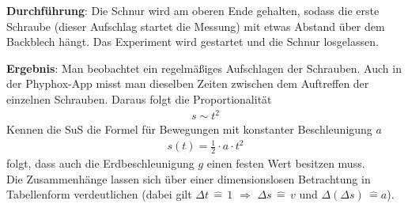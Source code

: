 \documentclass[../main.tex]{subfiles}
\begin{document}
\begin{tcolorbox}
    \vspace{-0.8cm}

    \begin{minipage}[]{0.7\textwidth}
        \textbf{Durchführung}:   Die Schnur wird am oberen Ende gehalten, sodass die erste Schraube (dieser Aufschlag startet die Messung) mit etwas Abstand über dem Backblech hängt. Das Experiment wird gestartet und die Schnur losgelassen.

        \vspace{0.5cm}
        \textbf{Ergebnis}: Man beobachtet ein regelmäßiges Aufschlagen der Schrauben. Auch in der Phyphox-App misst man dieselben Zeiten zwischen dem Auftreffen der einzelnen Schrauben. Daraus folgt die Proportionalität
        \begin{align*}
            s \sim t^2
        \end{align*}
        Kennen die SuS die Formel für Bewegungen mit konstanter Beschleunigung $a$
        \begin{align*}
            s(t) = \frac{1}{2} \cdot a \cdot  t^2
        \end{align*}
        folgt, dass auch die Erdbeschleunigung $g$ einen festen Wert besitzen muss.\\
        Die Zusammenhänge lassen sich über einer dimensionslosen Betrachtung in Tabellenform verdeutlichen (dabei gilt $\Delta t \, \widehat{=} \, 1$ $\Rightarrow$ $\Delta s \,\widehat{=}\, v$ und $\Delta(\Delta s)\,\widehat{=}a$).
    \end{minipage}
    \hspace{0.2cm}
    \begin{minipage}[]{0.2\textwidth}
        \vspace{1.3cm} 

\end{minipage}
\end{tcolorbox}
\end{document}
